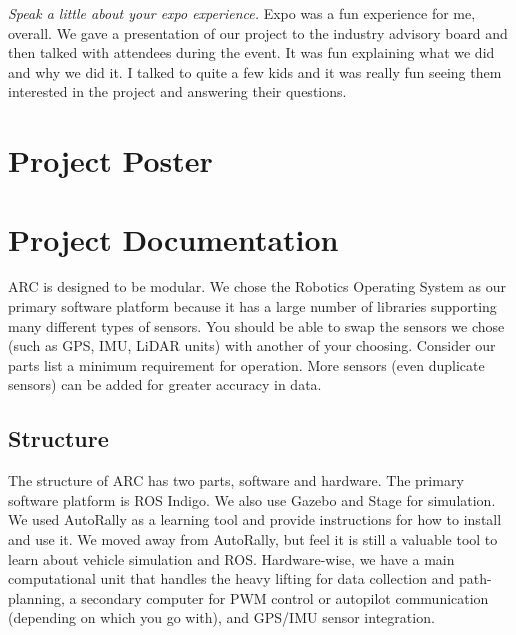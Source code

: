 \documentclass[compsoc,draftclsnofoot,onecolumn,10pt]{IEEEtran}
\begin{document}
\textit{Speak a little about your expo experience.}
Expo was a fun experience for me, overall. We gave a presentation of our project to the industry advisory board and then talked with attendees during the event. It was fun explaining what we did and why we did it. I talked to quite a few kids and it was really fun seeing them interested in the project and answering their questions.


\clearpage
\section{Project Poster}


\section{Project Documentation}
ARC is designed to be modular. We chose the Robotics Operating System as our primary software platform because it has a large number of libraries supporting many different types of sensors. You should be able to swap the sensors we chose (such as GPS, IMU, LiDAR units) with another of your choosing. Consider our parts list a minimum requirement for operation. More sensors (even duplicate sensors) can be added for greater accuracy in data.

\subsection{Structure}
The structure of ARC has two parts, software and hardware. The primary software platform is ROS Indigo. We also use Gazebo and Stage for simulation. We used AutoRally as a learning tool and provide instructions for how to install and use it. We moved away from AutoRally, but feel it is still a valuable tool to learn about vehicle simulation and ROS. Hardware-wise, we have a main computational unit that handles the heavy lifting for data collection and path-planning, a secondary computer for PWM control or autopilot communication (depending on which you go with), and GPS/IMU sensor integration.\\
\end{document}
